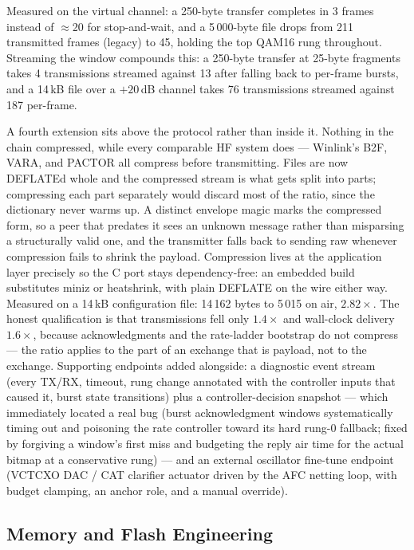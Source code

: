 Measured on the virtual channel: a 250-byte transfer completes in
3 frames instead of $\approx$20 for stop-and-wait, and a 5\,000-byte
file drops from 211 transmitted frames (legacy) to 45, holding the top
QAM16 rung throughout.  Streaming the window compounds this: a
250-byte transfer at 25-byte fragments takes 4 transmissions streamed
against 13 after falling back to per-frame bursts, and a 14\,kB file
over a $+20$\,dB channel takes 76 transmissions streamed against 187
per-frame.

A fourth extension sits above the protocol rather than inside it.
Nothing in the chain compressed, while every comparable HF system does
--- Winlink's B2F, VARA, and PACTOR all compress before transmitting.
Files are now DEFLATEd whole and the compressed stream is what gets
split into parts; compressing each part separately would discard most
of the ratio, since the dictionary never warms up.  A distinct envelope
magic marks the compressed form, so a peer that predates it sees an
unknown message rather than misparsing a structurally valid one, and
the transmitter falls back to sending raw whenever compression fails to
shrink the payload.  Compression lives at the application layer
precisely so the C port stays dependency-free: an embedded build
substitutes miniz or heatshrink, with plain DEFLATE on the wire either
way.  Measured on a 14\,kB configuration file: 14\,162 bytes to
5\,015 on air, $2.82\times$.  The honest qualification is that
transmissions fell only $1.4\times$ and wall-clock delivery
$1.6\times$, because acknowledgments and the rate-ladder bootstrap do
not compress --- the ratio applies to the part of an exchange that is
payload, not to the exchange.  Supporting endpoints added alongside: a
diagnostic event stream (every TX/RX, timeout, rung change annotated
with the controller inputs that caused it, burst state transitions)
plus a controller-decision snapshot --- which immediately located a
real bug (burst acknowledgment windows systematically timing out and
poisoning the rate controller toward its hard rung-0 fallback; fixed by
forgiving a window's first miss and budgeting the reply air time for
the actual bitmap at a conservative rung) --- and an external
oscillator fine-tune endpoint (VCTCXO DAC / CAT clarifier actuator
driven by the AFC netting loop, with budget clamping, an anchor role,
and a manual override).

\subsection{Memory and Flash Engineering}
\label{sec:cport_memory}


